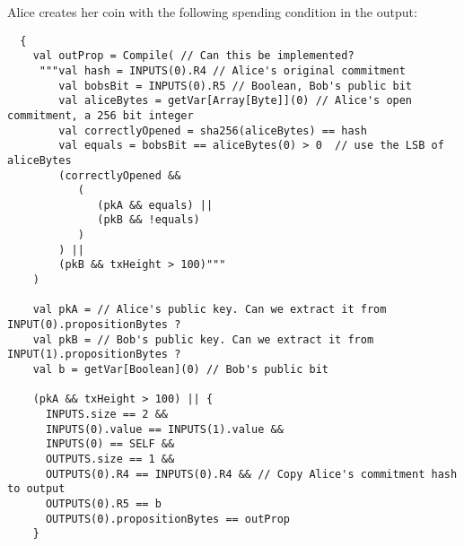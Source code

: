 \documentclass[11pt]{article}
\begin{document}
Alice creates her coin with the following spending condition in the output:

\begin{verbatim}
  {
    val outProp = Compile( // Can this be implemented?
     """val hash = INPUTS(0).R4 // Alice's original commitment
        val bobsBit = INPUTS(0).R5 // Boolean, Bob's public bit
        val aliceBytes = getVar[Array[Byte]](0) // Alice's open commitment, a 256 bit integer
        val correctlyOpened = sha256(aliceBytes) == hash 
        val equals = bobsBit == aliceBytes(0) > 0  // use the LSB of aliceBytes
        (correctlyOpened && 
           (
              (pkA && equals) || 
              (pkB && !equals)
           )
        ) || 
        (pkB && txHeight > 100)"""
    )

    val pkA = // Alice's public key. Can we extract it from INPUT(0).propositionBytes ? 
    val pkB = // Bob's public key. Can we extract it from INPUT(1).propositionBytes ?
    val b = getVar[Boolean](0) // Bob's public bit

    (pkA && txHeight > 100) || {
      INPUTS.size == 2 && 
      INPUTS(0).value == INPUTS(1).value && 
      INPUTS(0) == SELF &&
      OUTPUTS.size == 1 &&
      OUTPUTS(0).R4 == INPUTS(0).R4 && // Copy Alice's commitment hash to output
      OUTPUTS(0).R5 == b 
      OUTPUTS(0).propositionBytes == outProp
    }
\end{verbatim}

%
\end{document}

